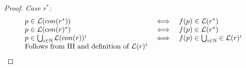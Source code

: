 \documentclass[twocolumn]{sig-alternate-10pt}
\newtheorem{defn}{Definition}
\newtheorem{lem}[thm]{Lemma}
\begin{document}
\begin{proof}
\emph{Case $r^*$:}
  \[ \begin{array}{lll}
    p \in \mathcal{L}(con(r^*)) &\iff& f(p) \in \mathcal{L}(r^*) \\
    p \in \mathcal{L}(con(r)^*) &\iff& f(p) \in \mathcal{L}(r^*) \\
    p \in \bigcup_{i \in \mathbb{N}} \mathcal{L}(con(r))^i &\iff& f(p) \in \bigcup_{i \in \mathbb{N}} \in \mathcal{L}(r)^i \\
    \text{Follows from IH and definition of } \mathcal{L}(r)^i & & \\
  \end{array} \]

\end{proof}






%





%
\end{document}
